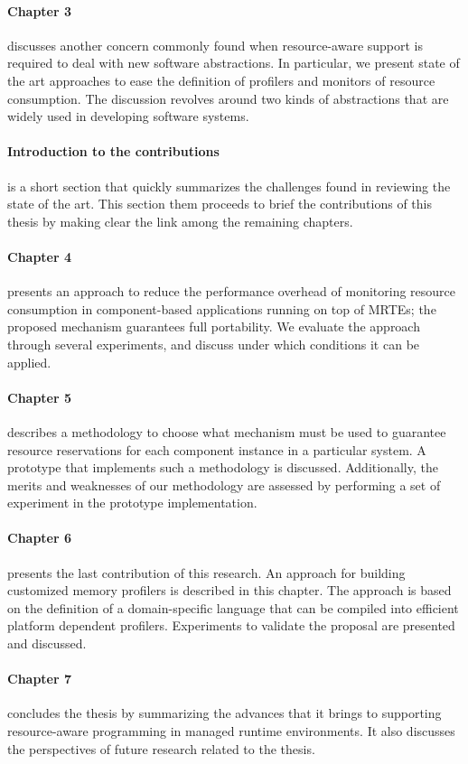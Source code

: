 \paragraph{Chapter 3} discusses another concern commonly found when resource-aware support is required to deal with new software abstractions.
In particular, we present state of the art approaches to ease the definition of profilers and monitors of resource consumption.
The discussion revolves around two kinds of abstractions that are widely used in developing software systems.

\paragraph{Introduction to the contributions} is a short section that quickly summarizes the challenges found in reviewing the state of the art. 
This section them proceeds to brief the contributions of this thesis by making clear the link among the remaining chapters.

\paragraph{Chapter 4} presents an approach to reduce the performance overhead of monitoring resource consumption in component-based applications running on top of MRTEs; the proposed mechanism guarantees full portability.
We evaluate the approach through several experiments, and discuss under which conditions it can be applied.

\paragraph{Chapter 5} describes a methodology to choose what mechanism must be used to guarantee resource reservations for each component instance in a particular system.
A prototype that implements such a methodology is discussed.
Additionally, the merits and weaknesses of our methodology are assessed by performing a set of experiment in the prototype implementation.

\paragraph{Chapter 6} presents the last contribution of this research.
An approach for building customized memory profilers is described in this chapter.
The approach is based on the definition of a domain-specific language that can be compiled into efficient platform dependent profilers.
Experiments to validate the proposal are presented and discussed.

\paragraph{Chapter 7} concludes the thesis by summarizing the advances that it brings to supporting resource-aware programming in managed runtime environments.
It also discusses the perspectives of future research related to the thesis.

